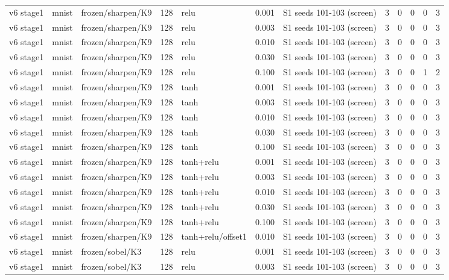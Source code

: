 \begin{table}[htbp]
{\begin{tabular}{@{}lllrlrlrrrrr@{}}
v6 stage1 & mnist & frozen/sharpen/K9 & 128 & relu & 0.001 & S1 seeds 101-103 (screen) & 3 & 0 & 0 & 0 & 3 \\
v6 stage1 & mnist & frozen/sharpen/K9 & 128 & relu & 0.003 & S1 seeds 101-103 (screen) & 3 & 0 & 0 & 0 & 3 \\
v6 stage1 & mnist & frozen/sharpen/K9 & 128 & relu & 0.010 & S1 seeds 101-103 (screen) & 3 & 0 & 0 & 0 & 3 \\
v6 stage1 & mnist & frozen/sharpen/K9 & 128 & relu & 0.030 & S1 seeds 101-103 (screen) & 3 & 0 & 0 & 0 & 3 \\
v6 stage1 & mnist & frozen/sharpen/K9 & 128 & relu & 0.100 & S1 seeds 101-103 (screen) & 3 & 0 & 0 & 1 & 2 \\
v6 stage1 & mnist & frozen/sharpen/K9 & 128 & tanh & 0.001 & S1 seeds 101-103 (screen) & 3 & 0 & 0 & 0 & 3 \\
v6 stage1 & mnist & frozen/sharpen/K9 & 128 & tanh & 0.003 & S1 seeds 101-103 (screen) & 3 & 0 & 0 & 0 & 3 \\
v6 stage1 & mnist & frozen/sharpen/K9 & 128 & tanh & 0.010 & S1 seeds 101-103 (screen) & 3 & 0 & 0 & 0 & 3 \\
v6 stage1 & mnist & frozen/sharpen/K9 & 128 & tanh & 0.030 & S1 seeds 101-103 (screen) & 3 & 0 & 0 & 0 & 3 \\
v6 stage1 & mnist & frozen/sharpen/K9 & 128 & tanh & 0.100 & S1 seeds 101-103 (screen) & 3 & 0 & 0 & 0 & 3 \\
v6 stage1 & mnist & frozen/sharpen/K9 & 128 & tanh+relu & 0.001 & S1 seeds 101-103 (screen) & 3 & 0 & 0 & 0 & 3 \\
v6 stage1 & mnist & frozen/sharpen/K9 & 128 & tanh+relu & 0.003 & S1 seeds 101-103 (screen) & 3 & 0 & 0 & 0 & 3 \\
v6 stage1 & mnist & frozen/sharpen/K9 & 128 & tanh+relu & 0.010 & S1 seeds 101-103 (screen) & 3 & 0 & 0 & 0 & 3 \\
v6 stage1 & mnist & frozen/sharpen/K9 & 128 & tanh+relu & 0.030 & S1 seeds 101-103 (screen) & 3 & 0 & 0 & 0 & 3 \\
v6 stage1 & mnist & frozen/sharpen/K9 & 128 & tanh+relu & 0.100 & S1 seeds 101-103 (screen) & 3 & 0 & 0 & 0 & 3 \\
v6 stage1 & mnist & frozen/sharpen/K9 & 128 & tanh+relu/offset1 & 0.010 & S1 seeds 101-103 (screen) & 3 & 0 & 0 & 0 & 3 \\
v6 stage1 & mnist & frozen/sobel/K3 & 128 & relu & 0.001 & S1 seeds 101-103 (screen) & 3 & 0 & 0 & 0 & 3 \\
v6 stage1 & mnist & frozen/sobel/K3 & 128 & relu & 0.003 & S1 seeds 101-103 (screen) & 3 & 0 & 0 & 0 & 3 \\

\end{tabular}}
\end{table}
